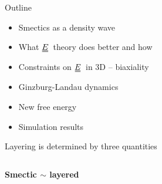 \documentclass[10pt,mathserif]{beamer}
\newcommand{\duf}[2]{\stackunder[0.5pt]{\stackunder[0.8pt]{\stackunder[1pt]{\ensuremath{#1}}{\rule{\widthof{\ensuremath{#2}}*\real{0.9}}{.1ex}}}{\rule{\widthof{\ensuremath{#2}}*\real{0.9}}{.1ex}}}{}}
\newcommand{\du}[1]{\duf{#1}{#1}}
\newcommand{\EE}{\ensuremath{\du{E}}}
\newcommand{\subheading}[1]{\large\textbf{#1}\normalsize}
\begin{document}
\begin{frame}[fragile]{Outline}
    \newrefsection
    \begin{itemize}
        \item Smectics as a density wave
        \item What \EE\ theory does better and how
        \item Constraints on \EE\ in 3D -- biaxiality
        \item Ginzburg-Landau dynamics
        \item New free energy
        \item Simulation results
    \end{itemize}
\end{frame}

\begin{frame}[fragile]{Layering is determined by three quantities}
    \newrefsection
    \begin{columns}
        \begin{column}{0.49\textwidth}
            \vspace{-\fill}
            \begin{center}
                \subheading{Smectic $\sim$ layered}
                \vspace{3em}


\end{center}
\end{column}
\end{columns}
\end{frame}
\end{document}
